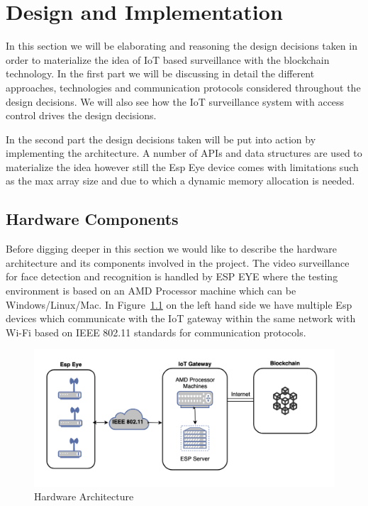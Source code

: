 \chapter{Design and Implementation}
\label{chap:cran_for_lora}

In this section we will be elaborating and reasoning the design decisions taken in order to materialize the idea of IoT based surveillance with the blockchain technology. In the first part we will be discussing in detail the different approaches, technologies and communication protocols considered throughout the design decisions. We will also see how the IoT surveillance system with access control drives the design decisions. 

In the second part the design decisions taken will be put into action by implementing the architecture. A number of APIs and data structures are used to materialize the idea however still the Esp Eye device comes with limitations such as the max array size and due to which a dynamic memory allocation is needed.  





\section{Hardware Components}

Before digging deeper in this section we would like to describe the hardware architecture and its components involved in the project.
The video surveillance for face detection and recognition is handled by ESP EYE where the testing environment is based on an AMD Processor machine which can be Windows/Linux/Mac.
In Figure~\ref{fig:hardarchitecture} on the left hand side we have multiple Esp devices which communicate with the IoT gateway within the same network with Wi-Fi based on IEEE 802.11 standards for communication protocols. 

\begin{figure}[!htb]
    \centering
    \includegraphics[width=1\textwidth]{figures/Hardware_architecture.png}
    \caption{Hardware Architecture}
    \label{fig:hardarchitecture}
\end{figure}


